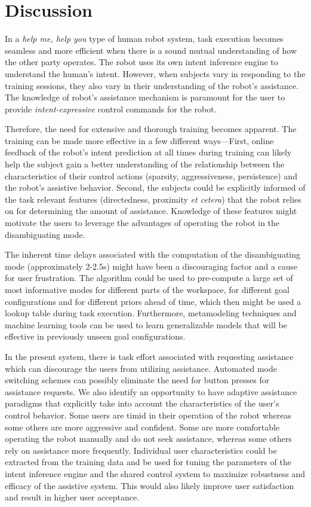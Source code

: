 \section{Discussion}\label{sec:discussions}
 
 
 In a \textit{help me, help you} type of human robot system, task execution becomes seamless and more efficient when there is a sound mutual understanding of how the other party operates. The robot uses its own intent inference engine to understand the human's intent. However, when subjects vary in responding to the training sessions, they also vary in their understanding of the robot's assistance. The knowledge of robot's assistance mechanism is paramount for the user to provide \textit{intent-expressive} control commands for the robot. 
 
 Therefore, the need for extensive and thorough training becomes apparent.
 The training can be made more effective in a few different ways---First, online feedback of the robot's intent prediction at all times during training can likely help the subject gain a better understanding of the relationship between the characteristics of their control actions (sparsity, aggressiveness, persistence) and the robot's assistive behavior. Second, the subjects could be explicitly informed of the task relevant features (directedness, proximity \textit{et cetera}) that the robot relies on for determining the amount of assistance. Knowledge of these features might motivate the users to leverage the advantages of operating the robot in the disambiguating mode. 
 
 The inherent time delays associated with the computation of the disambiguating mode (approximately 2-2.5s) might have been a discouraging factor and a cause for user frustration. The algorithm could be used to pre-compute a large set of most informative modes for different parts of the workspace, for different goal configurations and for different priors ahead of time, which then might be used a lookup table during task execution. Furthermore, metamodeling techniques and machine learning tools can be used to learn generalizable models that will be effective in previously unseen goal configurations. 
 
 In the present system, there is task effort associated with requesting assistance which can discourage the users from utilizing assistance. Automated mode switching schemes can possibly eliminate the need for button presses for assistance requests. 
 We also identify an opportunity to have adaptive assistance paradigms that explicitly take into account the characteristics of the user's control behavior. Some users are timid in their operation of the robot whereas some others are more aggressive and confident. Some are more comfortable operating the robot manually and do not seek assistance, whereas some others rely on assistance more frequently. Individual user characteristics could be extracted from the training data and be used for tuning the parameters of the intent inference engine and the shared control system to maximize robustness and efficacy of the assistive system. This would also likely improve user satisfaction and result in higher user acceptance. 
 
